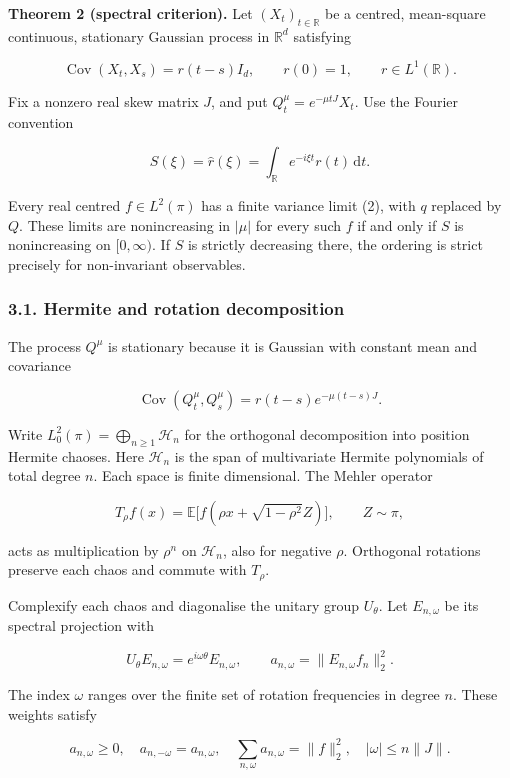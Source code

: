 \documentclass[
  british,
  11pt,
  a4paper,
]{article}
\begin{document}
\textbf{Theorem 2 (spectral criterion).} Let \((X_t)_{t\in\mathbb R}\)
be a centred, mean-square continuous, stationary Gaussian process in
\(\mathbb R^d\) satisfying

\[
\mathop{\mathrm{Cov}}(X_t,X_s)=r(t-s)I_d,\qquad r(0)=1,\qquad r\in L^1(\mathbb R).
\]

Fix a nonzero real skew matrix \(J\), and put
\(Q_t^\mu=e^{-\mu tJ}X_t\). Use the Fourier convention

\[
S(\xi)=\widehat r(\xi)=\int_{\mathbb R}e^{-i\xi t}r(t)\,\mathrm dt .
\]

Every real centred \(f\in L^2(\pi)\) has a finite variance limit (2),
with \(q\) replaced by \(Q\). These limits are nonincreasing in
\(|\mu|\) for every such \(f\) if and only if \(S\) is nonincreasing on
\([0,\infty)\). If \(S\) is strictly decreasing there, the ordering is
strict precisely for non-invariant observables.

\subsubsection{3.1. Hermite and rotation
decomposition}\label{hermite-and-rotation-decomposition}

The process \(Q^\mu\) is stationary because it is Gaussian with constant
mean and covariance

\[
\mathop{\mathrm{Cov}}(Q_t^\mu,Q_s^\mu)=r(t-s)e^{-\mu(t-s)J}.
\]

Write \(L^2_0(\pi)=\bigoplus_{n\ge1}\mathcal H_n\) for the orthogonal
decomposition into position Hermite chaoses. Here \(\mathcal H_n\) is
the span of multivariate Hermite polynomials of total degree \(n\). Each
space is finite dimensional. The Mehler operator

\[
T_\rho f(x)=\mathbb E\big[f(\rho x+\sqrt{1-\rho^2}Z)\big],
\qquad Z\sim\pi,
\]

acts as multiplication by \(\rho^n\) on \(\mathcal H_n\), also for
negative \(\rho\). Orthogonal rotations preserve each chaos and commute
with \(T_\rho\).

Complexify each chaos and diagonalise the unitary group \(U_\theta\).
Let \(E_{n,\omega}\) be its spectral projection with

\[
U_\theta E_{n,\omega}=e^{i\omega\theta}E_{n,\omega},
\qquad
a_{n,\omega}=\|E_{n,\omega}f_n\|_2^2.
\]

The index \(\omega\) ranges over the finite set of rotation frequencies
in degree \(n\). These weights satisfy

\[
a_{n,\omega}\ge0,\quad a_{n,-\omega}=a_{n,\omega},\quad
\sum_{n,\omega}a_{n,\omega}=\|f\|_2^2,
\quad |\omega|\le n\|J\|. \tag{3}
\]
\end{document}
